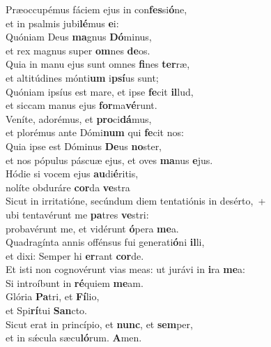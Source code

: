 \evenverse Præoccupémus fáciem ejus in con\textbf{fes}si\textbf{ó}ne,~\*\\
\evenverse et in psalmis jubi\textbf{lé}mus \textbf{e}i:\\
\oddverse Quóniam Deus \textbf{ma}gnus \textbf{Dó}minus,~\*\\
\oddverse et rex magnus super \textbf{om}nes \textbf{de}os.\\
\evenverse Quia in manu ejus sunt omnes \textbf{fi}nes \textbf{ter}ræ,~\*\\
\evenverse et altitúdines mónti\textbf{um} i\textbf{psí}us sunt;\\
\oddverse Quóniam ipsíus est mare, et ipse \textbf{fe}cit \textbf{il}lud,~\*\\
\oddverse et siccam manus ejus \textbf{for}ma\textbf{vé}runt.\\
\evenverse Veníte, adorémus, et \textbf{pro}ci\textbf{dá}mus,~\*\\
\evenverse et plorémus ante Dómi\textbf{num} qui \textbf{fe}cit nos:\\
\oddverse Quia ipse est Dóminus \textbf{De}us \textbf{no}ster,~\*\\
\oddverse et nos pópulus páscuæ ejus, et oves \textbf{ma}nus \textbf{e}jus.\\
\evenverse Hódie si vocem ejus \textbf{au}di\textbf{é}ritis,~\*\\
\evenverse nolíte obduráre \textbf{cor}da \textbf{ve}stra\\
\oddverse Sicut in irritatióne, secúndum diem tentatiónis in desérto,~+\\
\oddverse  ubi tentavérunt me \textbf{pa}tres \textbf{ve}stri:~\*\\
\oddverse probavérunt me, et vidérunt \textbf{ó}pera \textbf{me}a.\\
\evenverse Quadragínta annis offénsus fui generati\textbf{ó}ni \textbf{il}li,~\*\\
\evenverse et dixi: Semper hi \textbf{er}rant \textbf{cor}de.\\
\oddverse Et isti non cognovérunt vias meas: ut jurávi in \textbf{i}ra \textbf{me}a:~\*\\
\oddverse Si introíbunt in \textbf{ré}quiem \textbf{me}am.\\
\evenverse Glória \textbf{Pa}tri, et \textbf{Fí}lio,~\*\\
\evenverse et Spi\textbf{rí}tui \textbf{San}cto.\\
\oddverse Sicut erat in princípio, et \textbf{nunc}, et \textbf{sem}per,~\*\\
\oddverse et in sǽcula sæcu\textbf{ló}rum. \textbf{A}men.\\
